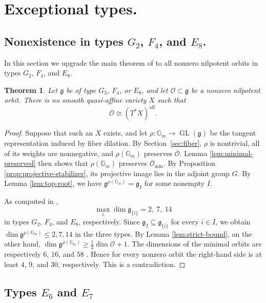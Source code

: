 \documentclass[12pt]{article}
\newtheorem{theorem}{Theorem}[section]
\theoremstyle{remark}
\theoremstyle{plain}
\newcommand{\Gm}{\mathbb G_m}
\newcommand{\aff}{\mathrm{aff}}
\begin{document}
\section{Exceptional types.}

\subsection{Nonexistence in types \texorpdfstring{$G_2$, $F_4$, and $E_8$.}{G2, F4, and E8}}\label{sec:G2F4E8}

In this section we upgrade the main theorem of \cite{Jia} to all
nonzero nilpotent orbits in types $G_2$, $F_4$, and $E_8$.

\begin{theorem}\label{thm:negative-exceptional}
Let $\mathfrak g$ be of type $G_2$, $F_4$, or $E_8$, and let
$\mathcal O\subset\mathfrak g$ be a nonzero nilpotent orbit.
There is no smooth quasi-affine variety $X$ such that
\[
\overline{\mathcal O}\cong(T^*X)^{\aff}.
\]
\end{theorem}

\begin{proof}
Suppose that such an $X$ exists, and let
$\rho:\Gm\to\operatorname{GL}(\mathfrak g)$ be the tangent
representation induced by fiber dilation. By Section~\ref{sec:fiber},
$\rho$ is nontrivial, all of its weights are nonnegative, and
$\rho(\Gm)$ preserves
$\overline{\mathcal O}$. Lemma \ref{lem:minimal-preserved} then shows
that $\rho(\Gm)$ preserves $\overline{\mathcal O}_{\min}$.
By Proposition \ref{prop:projective-stabilizer}, its projective image
lies in the adjoint group $G$.
By Lemma \ref{lem:top-root}, we have
$\mathfrak g^{\rho(\Gm)}=\mathfrak g_I$ for some nonempty $I$.

As computed in \cite[Proposition 3.1]{Jia},
\[
\max_i\dim\mathfrak g_{\{i\}}
=
2,\ 7,\ 14
\]
in types $G_2$, $F_4$, and $E_8$, respectively.
Since $\mathfrak g_I\subseteq\mathfrak g_{\{i\}}$ for every $i\in I$,
we obtain $\dim\mathfrak g^{\rho(\Gm)}\leq2,7,14$ in the three types.
By Lemma \ref{lem:strict-bound}, on the other hand,
$\dim\mathfrak g^{\rho(\Gm)}\geq\frac12\dim\mathcal O+1$.
The dimensions of the minimal orbits are respectively $6$, $16$, and $58$
\cite[Section 8.4]{CM}. Hence for every nonzero orbit the right-hand
side is at least $4$, $9$, and $30$, respectively.
This is a contradiction.
\end{proof}

\subsection{Types \texorpdfstring{$E_6$ and $E_7$}{E6 and E7}}\label{sec:E6E7}
\end{document}
